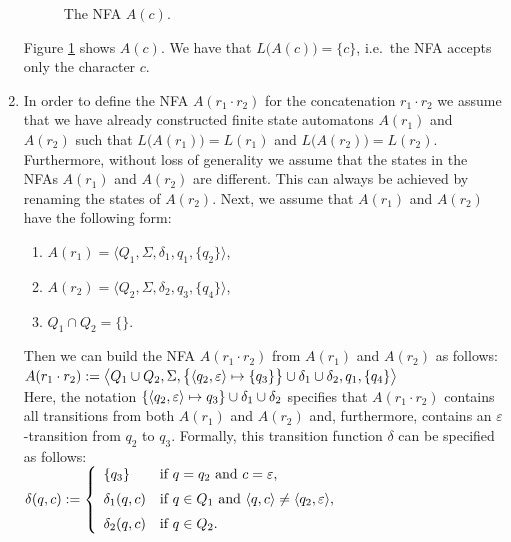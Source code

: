\begin{enumerate}
      \begin{figure}[!ht]
        \centering
      \caption{The \textsc{NFA} $A(c)$.}
      \label{fig:aChar.eps}
      \end{figure}
      Figure \ref{fig:aChar.eps} shows $A(c)$.
      We have that $L\bigl(A(c)\bigr) = \{c\}$, i.e.~the \textsc{NFA} accepts only the character $c$. 
\item In order to define the \textsc{NFA} $A(r_1 \cdot r_2)$ for the concatenation $r_1 \cdot r_2$ 
      we assume that we have already constructed finite state automatons $A(r_1)$ and $A(r_2)$
      such that $L\bigl(A(r_1)\bigr) = L(r_1)$ and $L\bigl(A(r_2)\bigr) = L(r_2)$.  Furthermore,
      without loss of generality we assume that the states in the \textsc{NFA}s  $A(r_1)$ and $A(r_2)$ are different. 
      This can always be achieved by renaming the states of $A(r_2)$.
      Next, we assume that $A(r_1)$ and $A(r_2)$ have the following form:
      \begin{enumerate}
      \item $A(r_1) = \bigl\langle Q_1, \Sigma, \delta_1, q_1, \{ q_2 \}\bigr\rangle$,
      \item $A(r_2) = \bigl\langle Q_2, \Sigma, \delta_2, q_3, \{ q_4 \}\bigr\rangle$,
      \item $Q_1 \cap Q_2 = \{\}$.
      \end{enumerate}
      Then we can build the \textsc{NFA} $A(r_1 \cdot r_2)$ from $A(r_1)$ and $A(r_2)$ as follows:
      \\[0.2cm]
      \hspace*{0.8cm}
       $A(r_1 \cdot r_2) := \bigl\langle Q_1 \cup Q_2, \Sigma, 
                \bigl\{ \pair(q_2,\varepsilon) \mapsto \{q_3\} \bigr\} 
                   \cup \delta_1 \cup \delta_2, q_1, \{ q_4 \} \bigr\rangle$
      \\[0.2cm]
      Here, the notation $\{ \pair(q_2,\varepsilon) \mapsto q_3 \} \cup \delta_1 \cup \delta_2$ specifies that
      $A(r_1 \cdot r_2)$ contains all transitions from both $A(r_1)$ and $A(r_2)$ and, furthermore,
      contains an $\varepsilon$-transition from $q_2$ to $q_3$.     
      Formally, this transition function  $\delta$ can be specified as follows:
      \\[0.2cm]
      \hspace*{1.3cm}
      $\delta(q,c) := \left\{
      \begin{array}{ll}
        \{ q_3 \}       & \mbox{if $q = q_2$ and $c = \varepsilon$}, \\[0.2cm]
        \delta_1(q, c)  & \mbox{if $q \in Q_1$ and $\pair(q,c) \not= \pair(q_2,\varepsilon)$}, \\[0.2cm]
        \delta_2(q, c)  & \mbox{if $q \in Q_2$.} 
      \end{array}\right.
      $
      \\[0.2cm]



\end{enumerate}
